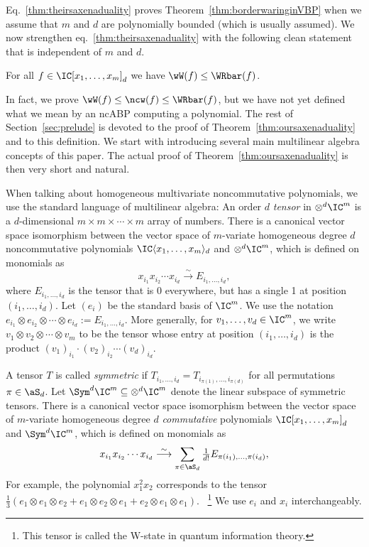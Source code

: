 Eq.~\eqref{thm:theirsaxenaduality} proves Theorem~\ref{thm:borderwaringinVBP} when we assume that $m$ and $d$ are polynomially bounded (which is usually assumed).
We now strengthen eq.~\eqref{thm:theirsaxenaduality} with the following clean statement that is independent of $m$ and $d$.
\begin{theorem}\label{thm:oursaxenaduality}
For all $f \in \IC[x_1,\ldots,x_m]_d$ we have $\wW(f) \leq \WRbar(f)$.
\end{theorem}
In fact, we prove
$\wW(f) \leq \ncw(f) \leq \WRbar(f)$, but we have not yet defined what we mean by an ncABP computing a polynomial.
The rest of Section~\ref{sec:prelude} is devoted to the proof of Theorem~\ref{thm:oursaxenaduality} and to this definition. We start with introducing several main multilinear algebra concepts of this paper. The actual proof of Theorem~\ref{thm:oursaxenaduality} is then very short and natural.

When talking about homogeneous multivariate noncommutative polynomials, we use the standard language of multilinear algebra: An order $d$ \emph{tensor} in $\otimes^d \IC^m$ is a $d$-dimensional $m \times m \times \cdots \times m$ array of numbers.
There is a canonical vector space isomorphism between the vector space of $m$-variate homogeneous degree $d$ noncommutative polynomials $\IC\langle x_1,\ldots,x_m\rangle_d$ and $\otimes^d \IC^m$, which is defined on monomials as
\[
x_{i_1} x_{i_2} \cdots x_{i_d} \stackrel{\sim}{\longrightarrow} E_{i_1,\ldots,i_d},
\]
where $E_{i_1,\ldots,i_d}$ is the tensor that is 0 everywhere, but has a single 1 at position $(i_1,\ldots,i_d)$.
Let $(e_i)$ be the standard basis of $\IC^m$. We use the notation $e_{i_1}\otimes e_{i_2}\otimes \cdots \otimes e_{i_d} := E_{i_1,\ldots,i_d}$.
More generally, for $v_1,\ldots,v_d \in \IC^m$, we write $v_1 \otimes v_2 \otimes \cdots \otimes v_m$ to be the tensor whose entry at position $(i_1,\ldots,i_d)$ is the product $(v_1)_{i_1}\cdot (v_2)_{i_2} \cdots (v_d)_{i_d}$.

A tensor $T$ is called \emph{symmetric} if $T_{i_1,\ldots,i_d} = T_{i_{\pi(1)},\ldots,i_{\pi(d)}}$ for all permutations $\pi \in \aS_d$. Let $\Sym^d \IC^m \subseteq \otimes^d \IC^m$ denote the linear subspace of symmetric tensors.
There is a canonical vector space isomorphism between the vector space of $m$-variate homogeneous degree $d$ \emph{commutative} polynomials $\IC[x_1,\ldots,x_m]_d$ and $\Sym^d \IC^m$, which is defined on monomials as
\[
x_{i_1} x_{i_2} \cdots x_{i_d} \stackrel{\sim}{\longrightarrow} \sum_{\pi \in \aS_d} \tfrac{1}{d!} E_{\pi(i_1),\ldots,\pi(i_d)},
\]
For example, the polynomial $x_1^2 x_2$ corresponds to the tensor $\frac 1 3 (e_1 \otimes e_1 \otimes e_2 + e_1 \otimes e_2 \otimes e_1 + e_2 \otimes e_1 \otimes e_1)$. \ \footnote{This tensor is called the W-state in quantum information theory.}
We use $e_i$ and $x_i$ interchangeably.

